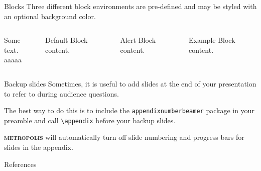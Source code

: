 \documentclass[10pt]{beamer}
\newcommand{\themename}{\textbf{\textsc{metropolis}}\xspace}
\begin{document}
\begin{frame}{Blocks}
    Three different block environments are pre-defined and may be styled with an
    optional background color.
  
    \begin{columns}[T,onlytextwidth]
          
            Some text.\\[2cm]
            aaaaa
    
    
          \begin{block}{Default}
            Block content.
          \end{block}
    
          \begin{alertblock}{Alert}
            Block content.
          \end{alertblock}
    
          \begin{exampleblock}{Example}
            Block content.
          \end{exampleblock}
    
      \end{columns}

  \end{frame}

\appendix

\begin{frame}[fragile]{Backup slides}
  Sometimes, it is useful to add slides at the end of your presentation to
  refer to during audience questions.

  The best way to do this is to include the \verb|appendixnumberbeamer|
  package in your preamble and call \verb|\appendix| before your backup slides.

  \themename will automatically turn off slide numbering and progress bars for
  slides in the appendix.  \cite{ConcreteMath}
\end{frame}

\begin{frame}[allowframebreaks]{References}

  
  

\end{frame}
\end{document}
